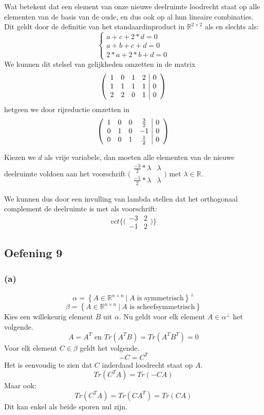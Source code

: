 \documentclass[lineaire_algebra_oplossingen.tex]{subfiles}
\begin{document}
Wat betekent dat een element van onze nieuwe deelruimte loodrecht staat op alle elementen van de basis van de oude, en dus ook op al hun lineaire combinaties. Dit geldt door de definitie van het standaardinproduct in $\mathbb{R}^{2\times2}$ als en slechts als:
\[\left\{
\begin{array}{l}
a+c+2*d=0\\
a+b+c+d=0\\
2*a+2*b+d=0
\end{array} \right.\]
We kunnen dit stelsel van gelijkheden omzetten in de matrix
\[\left(
\begin{array}{c c c c | c}
1 & 0 & 1 & 2 & 0\\
1 & 1 & 1 & 1 & 0\\
2 & 2 & 0 & 1 & 0
\end{array}
\right)\]
hetgeen we door rijreductie omzetten in
\[\left(
\begin{array}{c c c c | c}
1 & 0 & 0 & \frac{3}{2} & 0\\
0 & 1 & 0 & -1 & 0\\
0 & 0 & 1 & \frac{1}{2} & 0
\end{array}
\right)\]

Kiezen we $d$ als vrije variabele, dan moeten alle elementen van de nieuwe deelruimte voldoen aan het voorschrift $\bigl(\begin{smallmatrix}
\frac{-3}{2}*\lambda & \lambda \\
\frac{-1}{2}*\lambda & \lambda
\end{smallmatrix}\bigr)$ met $\lambda \in \mathbb{R}$.

We kunnen dus door een invulling van lambda stellen dat het orthogonaal complement de deelruimte is met als voorschrift:
\[
vct\{\bigl(\begin{smallmatrix}
-3 & 2 \\
-1 & 2
\end{smallmatrix}\bigr)\}
\]

\subsection{Oefening 9}
\subsubsection*{(a)}
\[
\alpha=
\left\{
A \in \mathbb{R}^{n\times n}\ |\ A \text{ is symmetrisch}
\right\}^\bot
\]
\[
\beta=
\left\{
A \in \mathbb{R}^{n\times n}\ |\ A \text{ is scheefsymmetrisch}
\right\}
\]
Kies een willekeurig element $B$ uit $\alpha$. Nu geldt voor elk element $A\in\alpha^\bot$ het volgende.
\[
A=A^T\text{ en } Tr(A^TB) = Tr(A^TB^T)= 0
\]
Voor elk element $C \in \beta$ geldt het volgende.
\[
-C = C^T
\]
Het is eenvoudig te zien dat $C$ inderdaad loodrecht staat op $A$.
\[
Tr(C^TA) = Tr(-CA)
\]
Maar ook:
\[
Tr(C^TA) = Tr(CA^T) = Tr(CA)
\]
Dit kan enkel als beide sporen nul zijn.
\end{document}

